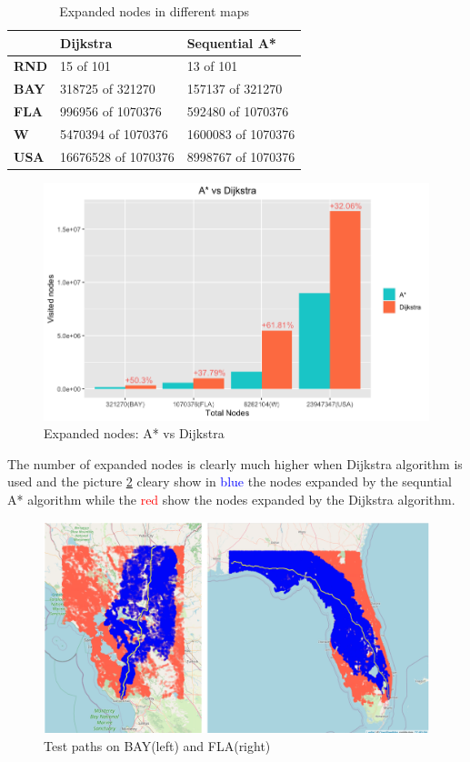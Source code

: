 \documentclass[twocolumn, switch]{article} %
\begin{document}
\begin{table}[ht!]
  \caption{Expanded nodes in different maps}
  \begin{tabular}{|l|l|l|}
  \hline
  \textbf{} & \textbf{Dijkstra} & \textbf{Sequential A*}       \\ \hline
  \textbf{RND}            & 15 of 101           & 13 of 101         \\ \hline
  \textbf{BAY}            & 318725 of 321270    & 157137 of 321270  \\ \hline
  \textbf{FLA}            & 996956 of 1070376   & 592480 of 1070376 \\ \hline
  \textbf{W}              & 5470394 of 1070376  & 1600083 of 1070376 \\ \hline
  \textbf{USA}            & 16676528 of 1070376 & 8998767 of 1070376 \\ \hline
  \end{tabular}
\end{table}
\begin{figure}[ht!]
  \centering
  \includegraphics[width=1\linewidth]{astar_dijkstra/expanded_nodes.png}
  \caption{Expanded nodes: A* vs Dijkstra}
  \label{histogramnodes}
\end{figure}
The number of expanded nodes is clearly much higher when Dijkstra algorithm is used and the picture
\ref{astardijkstramap} cleary show in \textcolor{blue}{blue} the nodes expanded by the sequntial A* algorithm
while the \textcolor{red}{red} show the nodes expanded by the Dijkstra algorithm.
\begin{figure}[ht!]
  \centering
  \includegraphics[width=1\linewidth]{dijkstra_astar.png}
  \caption{Test paths on BAY(left) and FLA(right)}
  \label{astardijkstramap}
\end{figure}
\end{document}
